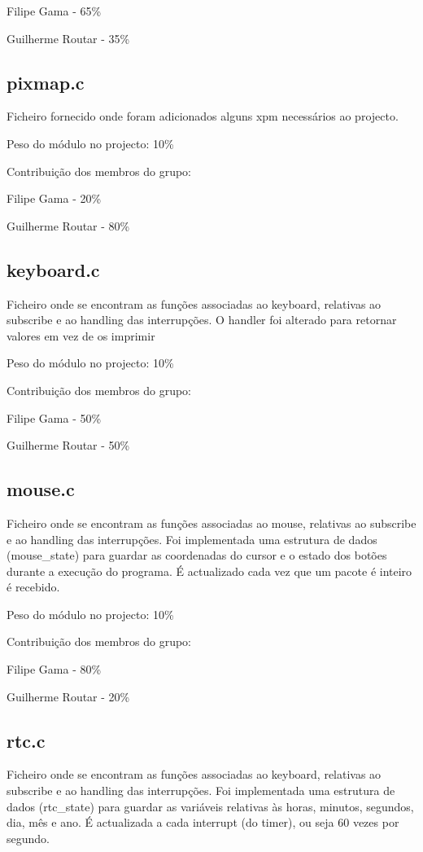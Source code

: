 \documentclass[a4paper]{article}
\begin{document}
Filipe Gama - 65\%

Guilherme Routar - 35\%

\subsection{pixmap.c}

Ficheiro fornecido onde foram adicionados alguns xpm necessários ao projecto. \bigskip

Peso do módulo no projecto: 10\%

Contribuição dos membros do grupo:

Filipe Gama - 20\%

Guilherme Routar - 80\%

\subsection{keyboard.c } 

Ficheiro onde se encontram as funções associadas ao keyboard, relativas ao subscribe e ao handling das interrupções. O handler foi alterado para retornar valores em vez de os imprimir \bigskip

Peso do módulo no projecto: 10\%

Contribuição dos membros do grupo:

Filipe Gama - 50\%

Guilherme Routar - 50\%


\subsection{mouse.c}

Ficheiro onde se encontram as funções associadas ao mouse, relativas ao subscribe e ao handling das interrupções. Foi implementada uma estrutura de dados (mouse\_state) para guardar as coordenadas do cursor e o estado dos botões durante a execução do programa. É actualizado cada vez que um pacote é inteiro é recebido. \bigskip

Peso do módulo no projecto: 10\%

Contribuição dos membros do grupo:

Filipe Gama - 80\%

Guilherme Routar - 20\%

\subsection{rtc.c}

Ficheiro onde se encontram as funções associadas ao keyboard, relativas ao subscribe e ao handling das interrupções. Foi implementada uma estrutura de dados (rtc\_state) para guardar as variáveis relativas às horas, minutos, segundos, dia, mês e ano. É actualizada a cada interrupt (do timer), ou seja 60 vezes por segundo. \bigskip
\end{document}
